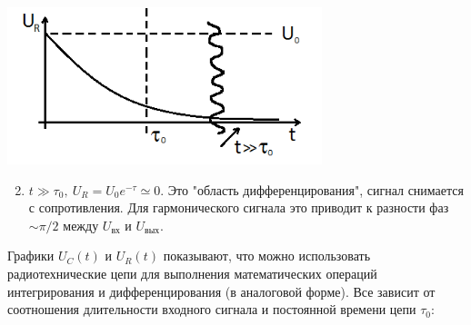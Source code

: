 \documentclass[../main/main.tex]{subfiles}
\begin{document}
\begin{minipage}{6cm}
\centering
\includegraphics[scale=0.6]{../section01/images/U_R_plot/U_R_plot.png} %
\end{minipage} \hfill   
\begin{minipage}{9cm}
\begin{enumerate}
\setcounter{enumi}{1}
\item $t \gg \tau_0,~U_R = U_0 e^{-\tau} \simeq 0$. Это "область дифференцирования", сигнал снимается с сопротивления. Для гармонического сигнала это приводит к разности фаз $\sim \pi / 2$ между $U_{\text{вх}}$ и $U_{\text{вых}}$. 
\end{enumerate}
\end{minipage}

Графики $U_C(t)$ и $U_R(t)$ показывают, что можно использовать радиотехнические цепи для выполнения математических операций интегрирования и дифференцирования (в аналоговой форме). Все зависит от соотношения длительности входного сигнала и постоянной времени цепи $\tau_0$:
\end{document}
